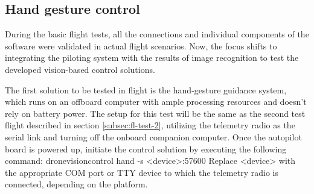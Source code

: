 \subsection{Hand gesture control}
\label{subsec:fl-test-4}

During the basic flight tests, all the connections and individual components of the software were validated in actual flight scenarios. Now, the focus shifts to integrating the piloting system with the results of image recognition to test the developed vision-based control solutions.

The first solution to be tested in flight is the hand-gesture guidance system, which runs on an offboard computer with ample processing resources and doesn't rely on battery power. The setup for this test will be the same as the second test flight described in section \ref{subsec:fl-test-2}, utilizing the telemetry radio as the serial link and turning off the onboard companion computer. Once the autopilot board is powered up, initiate the control solution by executing the following command:
dronevisioncontrol hand -s <device>:57600
Replace <device> with the appropriate COM port or TTY device to which the telemetry radio is connected, depending on the platform.


